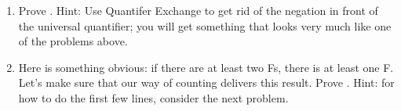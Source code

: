 \begin{enumerate}
{}


  \item Prove . Hint: Use Quantifer 
   Exchange to get rid of the negation in front of the universal quantifier; you 
   will get something that looks very much like one of the problems above.
\opts{

   \dotline
   \dotline
   \dotline
   \dotline
   \dotline
   \dotline
   \dotline
   \dotline
   \dotline
   \dotline
   \dotline
   \dotline
   \dotline

  }
  {
 

\begin{argumentN}[1]












\end{argumentN}


  }
  \cover{\newpage}
 \item Here is something obvious: if there are at least two Fs, there is at 
  least one F.  Let's make sure that our way of counting delivers this result.  
  Prove . Hint: for how to do the first few 
  lines, consider the next problem.


\end{enumerate}
